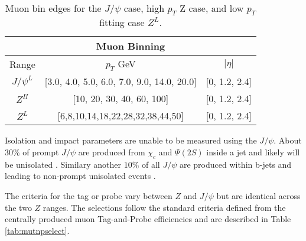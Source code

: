 \begin{table}
\centering
\caption{Muon bin edges for the $J/\psi$ case, high $p_T$ Z case, and low $p_T$ fitting case $Z^{L}$. }
\label{tab:mubin}
\begin{tabular}{c|c|c}
\hline 
\multicolumn{3}{c}{Muon Binning} \\ 
\hline 
Range & $p_T$ GeV & $|\eta|$ \\ 
\hline 
$J/\psi^{L}$ & [3.0, 4.0,  5.0, 6.0, 7.0, 9.0, 14.0,  20.0] & [0, 1.2, 2.4] \\ 

$Z^{H}$ &  [10, 20, 30, 40, 60, 100] & [0, 1.2, 2.4] \\ 

$Z^{L}$ & [6,8,10,14,18,22,28,32,38,44,50] & [0, 1.2, 2.4] \\ 
\hline 
\end{tabular} 
\end{table}



Isolation and impact parameters are unable to be measured using the $J/\psi$. About $30\%$ of prompt $J/\psi$ are produced from $\chi_c$ and $\Psi(2S)$ inside a jet and likely will be unisolated \cite{Lansberg:2006dh}. Similary another $10\%$ of all $J/\psi$ are produced within b-jets and leading to  non-prompt  unisolated events \cite{LHCb:2013itw}.

The criteria for the tag or probe vary between $Z$ and $J/\psi$ but are identical across the two $Z$ ranges. The selections follow the standard criteria defined from the centrally produced muon Tag-and-Probe efficiencies and are described in Table \ref{tab:mutnpselect}.\\

